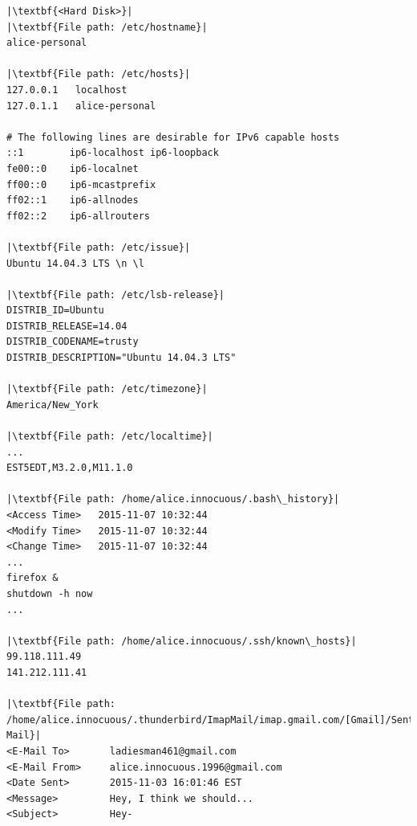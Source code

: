 \documentclass[addpoints]{exam}
\begin{document}
\begin{questions}

\pagebreak

\begin{lstlisting}
|\textbf{<Hard Disk>}|
|\textbf{File path: /etc/hostname}|
alice-personal

|\textbf{File path: /etc/hosts}|
127.0.0.1   localhost
127.0.1.1   alice-personal

# The following lines are desirable for IPv6 capable hosts
::1        ip6-localhost ip6-loopback
fe00::0    ip6-localnet
ff00::0    ip6-mcastprefix
ff02::1    ip6-allnodes
ff02::2    ip6-allrouters

|\textbf{File path: /etc/issue}|
Ubuntu 14.04.3 LTS \n \l

|\textbf{File path: /etc/lsb-release}|
DISTRIB_ID=Ubuntu
DISTRIB_RELEASE=14.04
DISTRIB_CODENAME=trusty
DISTRIB_DESCRIPTION="Ubuntu 14.04.3 LTS"

|\textbf{File path: /etc/timezone}|
America/New_York

|\textbf{File path: /etc/localtime}|
...
EST5EDT,M3.2.0,M11.1.0

|\textbf{File path: /home/alice.innocuous/.bash\_history}|
<Access Time>   2015-11-07 10:32:44
<Modify Time>   2015-11-07 10:32:44
<Change Time>   2015-11-07 10:32:44
...
firefox &
shutdown -h now
...

|\textbf{File path: /home/alice.innocuous/.ssh/known\_hosts}|
99.118.111.49
141.212.111.41

|\textbf{File path: /home/alice.innocuous/.thunderbird/ImapMail/imap.gmail.com/[Gmail]/Sent Mail}|
<E-Mail To>       ladiesman461@gmail.com
<E-Mail From>     alice.innocuous.1996@gmail.com
<Date Sent>       2015-11-03 16:01:46 EST
<Message>         Hey, I think we should...
<Subject>         Hey-           


\end{lstlisting}
\end{questions}
\end{document}
